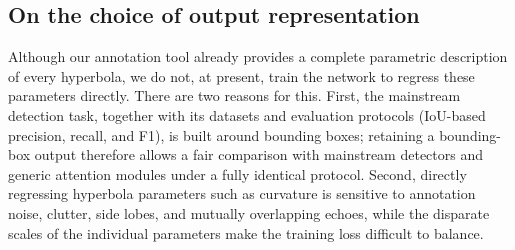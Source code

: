\documentclass[lettersize,journal]{IEEEtran}
\begin{document}
\subsection{On the choice of output representation}


Although our annotation tool already provides a complete parametric description
of every hyperbola, we do not, at present, train the network to regress these
parameters directly. 
There are two reasons for this. 
First, the mainstream detection task, together with its datasets and evaluation protocols (IoU-based
precision, recall, and F1), is built around bounding boxes; retaining a
bounding-box output therefore allows a fair comparison with mainstream detectors
and generic attention modules under a fully identical protocol. 
Second, directly regressing hyperbola parameters such as curvature is sensitive to annotation
noise, clutter, side lobes, and mutually overlapping echoes, while the disparate
scales of the individual parameters make the training loss difficult to balance.


\end{document}
